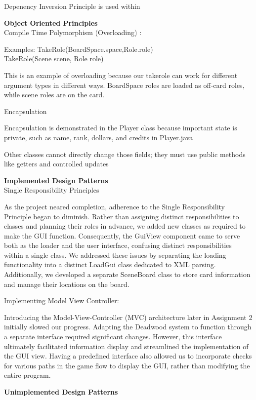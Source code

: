 \documentclass[12pt]{article}
\begin{document}
Depenency Inversion Principle is used within

\textbf {Object Oriented Principles} \\
Compile Time Polymorphism (Overloading) :

Examples:
TakeRole(BoardSpace.space,Role.role) \\
TakeRole(Scene scene, Role role) 

This is an example of overloading because our takerole can work for different argument types in different ways. BoardSpace roles are loaded as off-card roles, while scene roles are on the card.

Encapsulation

Encapsulation is demonstrated in the Player class because important state is private, such as name, rank, dollars, and credits in Player.java

Other classes cannot directly change those fields; they must use public methods like getters and controlled updates

\textbf{Implemented Design Patterns}\\
    Single Responsibility Principles

    As the project neared completion, adherence to the Single Responsibility Principle began to diminish. Rather than  assigning distinct responsibilities to classes and planning their roles in advance, we added new classes as required to make the GUI function. Consequently, the GuiView component came to serve both as the loader and the user interface, confusing distinct responsibilities within a single class.
    We addressed these issues by separating the loading functionality into a distinct LoadGui class dedicated to XML parsing. Additionally, we developed a separate SceneBoard class to store card information and manage their locations on the board.

    

    Implementing Model View Controller:

    Introducing the Model-View-Controller (MVC) architecture later in Assignment 2 initially slowed our progress. Adapting the Deadwood system to function through a separate interface required significant changes. However, this interface ultimately facilitated information display and streamlined the implementation of the GUI view. Having a predefined interface also allowed us to incorporate checks for various paths in the game flow to display the GUI, rather than modifying the entire program.



\textbf{Unimplemented Design Patterns}\\




\end{document}
